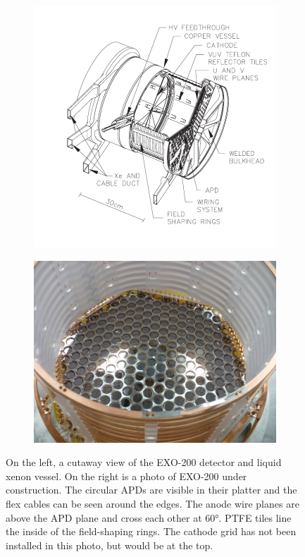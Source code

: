 \documentclass[herrin-thesis.tex]{subfiles}
\begin{document}
\begin{figure}[htbp]
\centering
\begin{subfigure}[c]{0.42\linewidth}
\includegraphics[width=\textwidth]{./photos/detector_TPC.pdf}
\end{subfigure}\hfill%
\begin{subfigure}[c]{0.54\linewidth}
\includegraphics[width=\textwidth]{./photos/detector_half.jpg}
\end{subfigure}\hfill%
\caption[The EXO-200 detector]{On the left, a cutaway view of the EXO-200 detector and liquid xenon vessel. On the right is a photo of EXO-200 under construction. The circular APDs are visible in their platter and the flex cables can be seen around the edges. The anode wire planes are above the APD plane and cross each other at \ang{60}. PTFE tiles line the inside of the field-shaping rings. The cathode grid has not been installed in this photo, but would be at the top.}
\label{fig:detector_TPC_vessel}
\end{figure}
\end{document}
